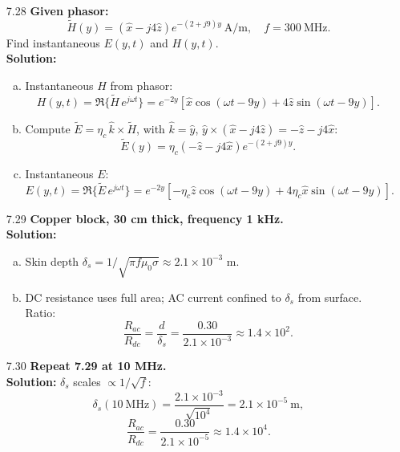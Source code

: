 \begin{enumerate}
\item[7.28] \textbf{Given phasor:}
\[\tilde H(y)=(\hat x - j4\hat z)e^{-(2+j9)y}~\mathrm{A/m},\quad f=300~\mathrm{MHz}.\]
Find instantaneous $E(y,t)$ and $H(y,t)$.  
\\
\textbf{Solution:}
\begin{enumerate}[(a)]
  \item Instantaneous $H$ from phasor:
  \[H(y,t)=\Re\{\tilde H\,e^{j\omega t}\}
    =e^{-2y}[\hat x\cos(\omega t-9y)+4\hat z\sin(\omega t-9y)].\]
  \item Compute $\tilde E=\eta_c\,\hat k\times\tilde H$, with $\hat k=\hat y$, $\hat y\times(\hat x - j4\hat z)= -\hat z - j4\hat x$:
  \[\tilde E(y)=\eta_c(-\hat z - j4\hat x)e^{-(2+j9)y}.\]
  \item Instantaneous $E$:
  \[E(y,t)=\Re\{\tilde E\,e^{j\omega t}\}
    =e^{-2y}[-\eta_c\hat z\cos(\omega t-9y)+4\eta_c\hat x\sin(\omega t-9y)].\]
\end{enumerate}

\item[7.29] \textbf{Copper block, 30 cm thick, frequency 1 kHz.}
\\
\textbf{Solution:}
\begin{enumerate}[(a)]
  \item Skin depth $\delta_s=1/\sqrt{\pi f\mu_0\sigma}\approx2.1\times10^{-3}$ m.  
  \item DC resistance uses full area; AC current confined to $\delta_s$ from surface.  Ratio:
  \[\frac{R_{ac}}{R_{dc}}=\frac{d}{\delta_s}=\frac{0.30}{2.1\times10^{-3}}\approx1.4\times10^2.\]
\end{enumerate}

\item[7.30] \textbf{Repeat 7.29 at 10 MHz.}
\\
\textbf{Solution:}  $\delta_s$ scales $\propto1/\sqrt{f}$:
\[\delta_s(10~\mathrm{MHz})=\frac{2.1\times10^{-3}}{\sqrt{10^4}}=2.1\times10^{-5}~\mathrm{m},\]
\[\frac{R_{ac}}{R_{dc}}=\frac{0.30}{2.1\times10^{-5}}\approx1.4\times10^4.\]

\end{enumerate}
